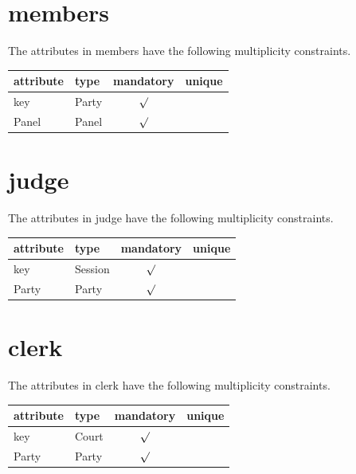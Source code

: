 \documentclass[10pt,a4paper]{report}              %
\theoremstyle{plain}\theorembodyfont{\rmfamily}\newtheorem{definition}{Definition}[section]
\theoremstyle{plain}\theorembodyfont{\rmfamily}\newtheorem{designrule}[definition]{Requirement}
\begin{document}
\section{members}

\label{sct:plug members}

The attributes in members have the following multiplicity constraints. 

\begin{center}
\begin{tabular}{llcc}
attribute & type & mandatory & unique\\
\hline
key  & Party & $\surd$ & \\
Panel & Panel & $\surd$ & \\
\end{tabular}
\end{center}

\section{judge}

\label{sct:plug judge}

The attributes in judge have the following multiplicity constraints. 

\begin{center}
\begin{tabular}{llcc}
attribute & type & mandatory & unique\\
\hline
key  & Session & $\surd$ & \\
Party & Party & $\surd$ & \\
\end{tabular}
\end{center}

\section{clerk}

\label{sct:plug clerk}

The attributes in clerk have the following multiplicity constraints. 

\begin{center}
\begin{tabular}{llcc}
attribute & type & mandatory & unique\\
\hline
key  & Court & $\surd$ & \\
Party & Party & $\surd$ & \\
\end{tabular}
\end{center}
\end{document}
